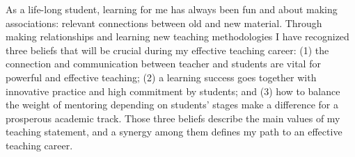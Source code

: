 
\begin{comment}

Beliefs:

1-3

1. Engagement, participation and bla bla
2. Content, 
3. Mentoring

\end{comment}
 















\vspace{5mm}

As a life-long student, learning for me has always been fun and about making associations: relevant connections between old and new material. Through making relationships and learning new teaching methodologies I have recognized three beliefs that will be crucial during my effective teaching career: (1) the connection and communication between teacher and students are vital for powerful and effective teaching; (2) a learning success goes together with innovative practice and high commitment by students; and (3) how to balance the weight of mentoring depending on students' stages make a difference for a prosperous academic track. Those three beliefs describe the main values of my teaching statement, and a synergy among them defines my path to an effective teaching career.\par





